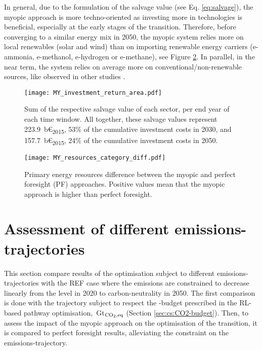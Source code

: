 In general, due to the formulation of the salvage value (see Eq. \ref{eq:salvage}), the myopic approach is more techno-oriented as investing more in technologies is beneficial, especially at the early stages of the transition. Therefore, before converging to a similar energy mix in 2050, the myopic system relies more on local renewables (\eg solar and wind) than on importing renewable energy carriers (\eg e-ammonia, e-methanol, e-hydrogen or e-methane), see Figure \ref{fig:my_pestd_res_cat_diff}. In parallel, in the near term, the system relies on average more on conventional/non-renewable sources, like observed in other studies \cite{keppo2010short,nyqvist2005limited,hedenus2006induced}.

\begin{figure}[!htbp]
\centering
\texttt{[image: MY\_investment\_return\_area.pdf]}
\caption{Sum of the respective salvage value of each sector, per end year of each time window. All together, these salvage values represent 223.9~b€\textsubscript{2015}, 53\% of the cumulative investment costs in 2030, and 157.7~b€\textsubscript{2015}, 24\% of the cumulative investment costs in 2050.}
\label{fig:my_pestd_inv_return_area}
\end{figure}

 \begin{figure}[!htbp]
\centering
\texttt{[image: MY\_resources\_category\_diff.pdf]}
\caption{Primary energy resources difference between the myopic and perfect foresight (PF) approaches. Positive values mean that the myopic approach is higher than perfect foresight.}
\label{fig:my_pestd_res_cat_diff}
\end{figure}

\section{Assessment of different emissions-trajectories}
\label{app:CO2_trajectories}
This section compare results of the optimisation subject to different emissions-trajectories with the REF case where the emissions are constrained to decrease linearly from the level in 2020 to carbon-neutrality in 2050. The first comparison is done with the trajectory subject to respect the -budget prescribed in the \gls{RL}-based pathway optimisation, \,Gt$_{\ce{CO2},\text{eq}}$ (Section \ref{sec:cs:CO2-budget}). Then, to assess the impact of the myopic approach on the optimisation of the transition, it is compared to perfect foresight results, alleviating the constraint on the emissions-trajectory.


